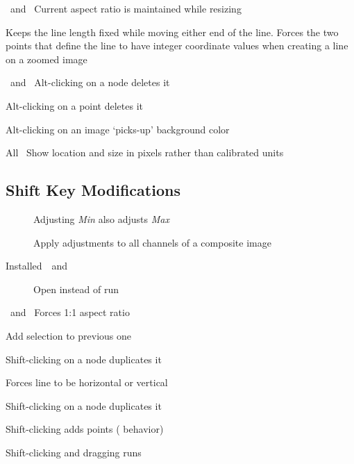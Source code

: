 \ and\ 
Current aspect ratio is maintained while resizing

 Keeps the line length fixed
while moving either end of the line. Forces the two points that define
the line to have integer coordinate values when creating a line on
a zoomed image 

\ and\ 
Alt-clicking on a node deletes it 

 Alt-clicking on a point deletes it 

 Alt-clicking on an image `picks-up'
background color 

All\textsf{\ } Show location and size in pixels
rather than calibrated units


\subsection{Shift Key Modifications}
\begin{description}
\item [{}] Adjusting
\emph{Min} also adjusts \emph{Max}
\item [{}] Apply
adjustments to all channels of a composite image
\item [{Installed\ \ and\ }] Open
instead of run
\end{description}
\ and\ 
Forces 1:1 aspect ratio 

 Add selection to previous one

 Shift-clicking on a node duplicates
it

 Forces line to be horizontal
or vertical

 Shift-clicking on a node duplicates
it

 Shift-clicking adds points (
behavior)

 Shift-clicking and dragging runs \textsf{}


